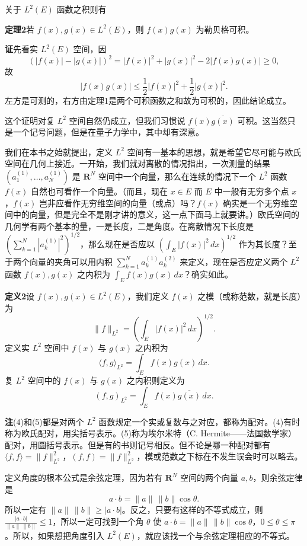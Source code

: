 关于 $L^2(E)$ 函数之积则有

\noindent\textbf{定理2}\quad 若 $f(x),g(x)\in L^2(E)$，则 $f(x)g(x)$ 为勒贝格可积。

\noindent\textbf{证}\quad 先看实 $L^2(E)$ 空间，因
\[
 (|f(x)|-|g(x)|)^2=|f(x)|^2+|g(x)|^2-2|f(x)g(x)|\ge0,
\]
故
\[
 |f(x)g(x)|\le\frac12|f(x)|^2+\frac12|g(x)|^2.
\]
左方是可测的，右方由定理1是两个可积函数之和故为可积的，因此结论成立。

这个证明对复 $L^2$ 空间自然仍成立，但我们习惯说 $f(x)\overline{g(x)}$ 可积。这当然只是一个记号问题，但是在量子力学中，其中却有深意。

我们在本书之始就提出，定义 $L^2$ 空间有一基本的思想，就是希望它尽可能与欧氏空间在几何上接近。一开始，我们就对离散的情况指出，一次测量的结果 $(a_1^{(1)},\ldots,a_N^{(1)})$ 是 $\mathbf R^N$ 空间中一个向量，那么在连续的情况下一个 $L^2$ 函数 $f(x)$ 自然也可看作一个向量。（而且，现在 $x\in E$ 而 $E$ 中一般有无穷多个点 $x$，$f(x)$ 岂非应看作无穷维空间的向量（或点）吗？$f(x)$ 确实是一个无穷维空间中的向量，但是完全不是刚才讲的意义，这一点下面马上就要讲。）欧氏空间的几何学有两个基本的量，一是长度，二是角度。在离散情况下长度是 $\left(\sum_{k=1}^N|a_k^{(1)}|^2\right)^{1/2}$，那么现在是否应以 $\left(\int_E|f(x)|^2\,dx\right)^{1/2}$ 作为其长度？至于两个向量的夹角可以用内积 $\sum_{k=1}^Na_k^{(1)}a_k^{(2)}$ 来定义，现在是否应定义两个 $L^2$ 函数 $f(x),g(x)$ 之内积为 $\int_E f(x)g(x)\,dx$？确实如此。

\noindent\textbf{定义2}\quad 设 $f(x),g(x)\in L^2(E)$，我们定义 $f(x)$ 之模（或称范数，就是长度）为
\begin{equation}
 \|f\|_{L^2}=\left(\int_E|f(x)|^2\,dx\right)^{1/2}.
 \tag{3}
\end{equation}
定义实 $L^2$ 空间中 $f(x)$ 与 $g(x)$ 之内积为
\begin{equation}
 \langle f,g\rangle_{L^2}=\int_E f(x)g(x)\,dx.
 \tag{4}
\end{equation}
复 $L^2$ 空间中的 $f(x)$ 与 $g(x)$ 之内积则定义为
\begin{equation}
 (f,g)_{L^2}=\int_E f(x)\overline{g(x)}\,dx.
 \tag{5}
\end{equation}

\noindent\textbf{注}\quad (4)和(5)都是对两个 $L^2$ 函数规定一个实或复数与之对应，都称为配对。(4)有时称为欧氏配对，用尖括号表示。(5)称为埃尔米特（C. Hermite——法国数学家）配对，用圆括号表示。但是有的书则记号相反。但不论是哪一种配对都有 $\langle f,f\rangle=\|f\|_{L^2}^2$，$(f,f)=\|f\|_{L^2}^2$，模或范数之下标在不发生误会时可以略去。

定义角度的根本公式是余弦定理，因为若有 $\mathbf R^N$ 空间的两个向量 $a,b$，则余弦定律是
\[
 a\cdot b=\|a\|\,\|b\|\cos\theta.
\]
所以一定有 $\|a\|\,\|b\|\ge|a\cdot b|$。反之，只要有这样的不等式成立，则 $\frac{|a\cdot b|}{\|a\|\,\|b\|}\le1$，所以一定可找到一个角 $\theta$ 使 $a\cdot b=\|a\|\,\|b\|\cos\theta$，$0\le\theta\le\pi$。所以，如果想把角度引入 $L^2(E)$，就应该找一个与余弦定理相应的不等式。

